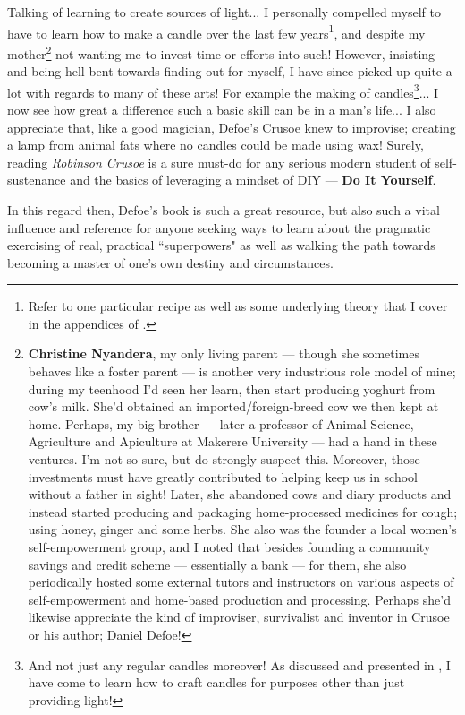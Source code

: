 \documentclass[a4paper]{article}
\begin{document}
Talking of learning to create sources of light... I personally compelled myself to have to learn how to make a candle over the last few years\footnote{Refer to one particular recipe as well as some underlying theory that I cover in the appendices of \cite{lutalo_2025_grimlumtauto}.}, and despite my mother\footnote{\textbf{Christine Nyandera}, my only living parent --- though she sometimes behaves like a foster parent --- is another very industrious role model of mine; during my teenhood I'd seen her learn, then start producing yoghurt from cow's milk. She'd obtained an imported/foreign-breed cow we then kept at home. Perhaps, my big brother --- later a professor of Animal Science, Agriculture and Apiculture at Makerere University --- had a hand in these ventures. I'm not so sure, but do strongly suspect this. Moreover, those investments must have greatly contributed to helping keep us in school without a father in sight! Later, she abandoned cows and diary products and instead started producing and packaging home-processed medicines for cough; using honey, ginger and some herbs. She also was the founder a local women's self-empowerment group, and I noted that besides founding a community savings and credit scheme --- essentially a bank --- for them, she also periodically hosted some external tutors and instructors on various aspects of self-empowerment and home-based production and processing. Perhaps she'd likewise appreciate the kind of improviser, survivalist and inventor in Crusoe or his author; Daniel Defoe!} not wanting me to invest time or efforts into such! However, insisting and being hell-bent towards finding out for myself, I have since picked up quite a lot with regards to many of these arts!  For example the making of candles\footnote{And not just any regular candles moreover! As discussed and presented in \cite{lutalo_2025_grimlumtauto}, I have come to learn how to craft candles for purposes other than just providing light!}... I now see how great a difference such a basic skill can be in a man's life... I also appreciate that, like a good magician, Defoe's Crusoe knew to improvise; creating a lamp from animal fats where no candles could be made using wax! Surely, reading \textit{Robinson Crusoe} is a sure must-do for any serious modern student of self-sustenance and the basics of leveraging a mindset of DIY --- \textbf{Do It Yourself}. 

In this regard then, Defoe's book is such a great resource, but also such a vital influence and reference for anyone seeking ways to learn about the pragmatic exercising of real, practical ``superpowers" as well as walking the path towards becoming a master of one's own destiny and circumstances.
\end{document}
